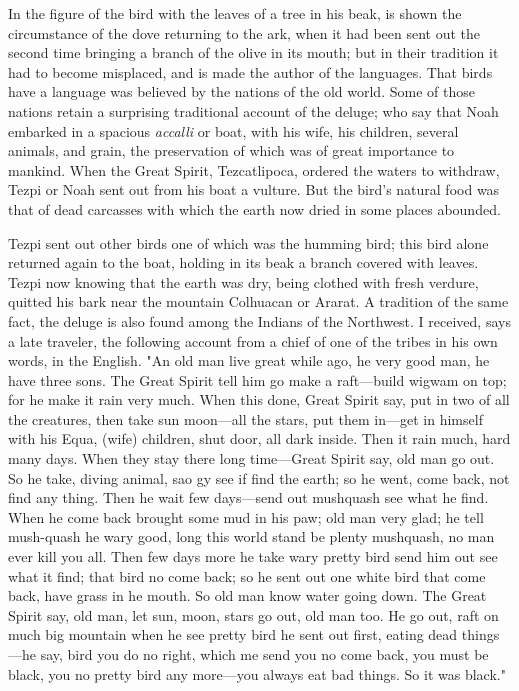 In the figure of the bird with the leaves of a tree in his beak, is shown the circumstance of the
dove returning to the ark, when it had been sent out the second time bringing a branch of the
olive in its mouth; but in their tradition it had to become misplaced, and is made the author of
the languages. That birds have a language was believed by the nations of the old world. Some
of those nations retain a surprising traditional account of the deluge; who say that Noah
embarked in a spacious \textit{accalli} or boat, with his wife, his children, several animals, and grain,
the preservation of which was of great importance to mankind. When the Great Spirit,
Tezcatlipoca, ordered the waters to withdraw, Tezpi or Noah sent out from his boat a vulture.
But the bird's natural food was that of dead carcasses with which the earth now dried in some
places abounded.

Tezpi sent out other birds one of which was the humming bird; this bird alone returned again
to the boat, holding in its beak a branch covered with leaves. Tezpi now knowing that the
earth was dry, being clothed with fresh verdure, quitted his bark near the mountain
Colhuacan or Ararat. A tradition of the same fact, the deluge is also found among the Indians
of the Northwest. I received, says a late traveler, the following account from a chief of one of
the tribes in his own words, in the English. "An old man live great while ago, he very good
man, he have three sons. The Great Spirit tell him go make a raft—build wigwam on top; for
he make it rain very much. When this done, Great Spirit say, put in two of all the creatures,
then take sun moon—all the stars, put them in—get in himself with his Equa, (wife) children,
shut door, all dark inside. Then it rain much, hard many days. When they stay there long
time—Great Spirit say, old man go out. So he take, diving animal, sao gy see if find the
earth; so he went, come back, not find any thing. Then he wait few days—send out
mushquash see what he find. When he come back brought some mud in his paw; old man
very glad; he tell mush-quash he wary good, long this world stand be plenty mushquash, no
man ever kill you all. Then few days more he take wary pretty bird send him out see what it
find; that bird no come back; so he sent out one white bird that come back, have grass in he
mouth. So old man know water going down. The Great Spirit say, old man, let sun, moon,
stars go out, old man too. He go out, raft on much big mountain when he see pretty bird he
sent out first, eating dead things—he say, bird you do no right, which me send you no come
back, you must be black, you no pretty bird any more—you always eat bad things. So it was
black."

